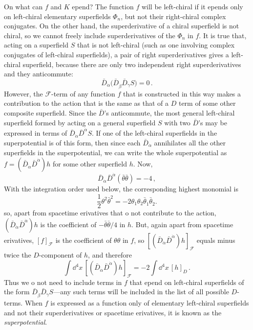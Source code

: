 On what can $f$ and $K$ \dd epend? The function $f$ will be left-chiral if it
\dd epends only on left-chiral elementary superfields $\Phi_n$, but not their
right-chiral complex conjugates. On the other hand, the superderivative of a
chiral superfield is not chiral, so we cannot freely include superderivatives
of the $\Phi_n$ in $f$. It is true that, acting on a superfield $S$ that is not
left-chiral (such as one involving complex conjugates of left-chiral
superfields), a pair of right superderivatives gives a left-chiral superfield,
because there are only two independent right superderivatives and they
anticommute:
\[
  \bar D_{\dot\alpha}
  \bigl(\bar D_{\dot\beta}\bar D_{\dot\gamma}S\bigr)=0\,.
\]
However, the $\mathcal{F}$-term of any function $f$ that is constructed in
this way makes a contribution to the action that is the same as that of a
$D$ term of some other composite superfield. Since the \(\bar D\)'s
anticommute, the most general left-chiral superfield formed by acting on a
general superfield \(S\) with two \(\bar D\)'s may be expressed in terms of
\(\bar D_{\dot\alpha}\bar D^{\dot\alpha}S\). If one of the left-chiral
superfields in the superpotential is of this form, then since each
\(\bar D_{\dot\alpha}\) annihilates
all the other superfields in the superpotential, we can write the whole
superpotential as
\(f=(\bar D_{\dot\alpha}\bar D^{\dot\alpha})h\) for some other
superfield $h$. Now,
\[
  \bar D_{\dot\alpha}\bar D^{\dot\alpha}
  (\bar\theta\bar\theta)=-4\,,
\]
With the integration order used below, the corresponding highest monomial is
\[
  \frac12\theta^2\bar\theta^2
  =-2\theta_1\theta_2
    \bar\theta_{\dot1}\bar\theta_{\dot2}.
\]
so, apart from spacetime \dd erivatives that \dd o not contribute to the action,
\((\bar D_{\dot\alpha}\bar D^{\dot\alpha})h\) is the coefficient of
\(-\bar\theta\bar\theta/4\) in \(h\). But, again apart from spacetime
\dd erivatives, $[f]_{\mathcal{F}}$ is the coefficient of
\(\theta\theta\) in \(f\), so
  \([(\bar D_{\dot\alpha}\bar D^{\dot\alpha})h]_{\mathcal{F}}\) equals minus
  twice the \(D\)-component of \(h\), and therefore
\begin{equation}
  \int \dd^4x\,
  [(\bar D_{\dot\alpha}\bar D^{\dot\alpha})h]_{\mathcal{F}}
  =-2\int \dd^4x\,[h]_D\,.
  \tag{26.3.31}\label{eq:26.3.31}
\end{equation}
Thus we \dd o not need to include terms in $f$ that \dd epend on left-chiral
superfields of the form
\(\bar D_{\dot\beta}\bar D_{\dot\gamma}S\)---any such terms
will be included in the list of all possible $D$-terms. When $f$ is expressed
as a function only of elementary left-chiral superfields and not their
superderivatives or spacetime \dd erivatives, it is known as the
\emph{superpotential}.

